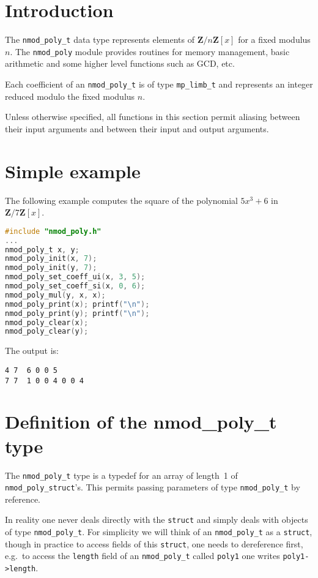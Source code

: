 \documentclass[a4paper,10pt]{book}
\newcommand{\Z}{\mathbf{Z}}%
\newcommand{\code}{\lstinline}
\begin{document}
\section{Introduction}

The \code{nmod_poly_t} data type represents elements of $\Z/n\Z[x]$ for
a fixed modulus $n$. The \code{nmod_poly} module provides routines for 
memory management, basic arithmetic and some higher level functions
such as GCD, etc.

Each coefficient of an \code{nmod_poly_t} is of type \code{mp_limb_t}
and represents an integer reduced modulo the fixed modulus $n$.  

Unless otherwise specified, all functions in this section permit aliasing 
between their input arguments and between their input and output arguments.

\section{Simple example}

The following example computes the square of the polynomial $5x^3 + 6$
in $\Z/7\Z[x]$.
\begin{lstlisting}[language=c]
#include "nmod_poly.h"
...
nmod_poly_t x, y;
nmod_poly_init(x, 7);
nmod_poly_init(y, 7);
nmod_poly_set_coeff_ui(x, 3, 5);
nmod_poly_set_coeff_si(x, 0, 6);
nmod_poly_mul(y, x, x);
nmod_poly_print(x); printf("\n");
nmod_poly_print(y); printf("\n");
nmod_poly_clear(x);
nmod_poly_clear(y);
\end{lstlisting}

The output is:
\begin{lstlisting}
4 7  6 0 0 5
7 7  1 0 0 4 0 0 4
\end{lstlisting}

\section{Definition of the nmod\_poly\_t type}

The \code{nmod_poly_t} type is a typedef for an array of length~1 of 
\code{nmod_poly_struct}'s.  This permits passing parameters of type 
\code{nmod_poly_t} by reference. 

In reality one never deals directly with the \code{struct} and simply deals 
with objects of type \code{nmod_poly_t}.  For simplicity we will think of an 
\code{nmod_poly_t} as a \code{struct}, though in practice to access fields 
of this \code{struct}, one needs to dereference first, e.g.\ to access the 
\code{length} field of an \code{nmod_poly_t} called \code{poly1} one writes 
\code{poly1->length}. 
\end{document}
